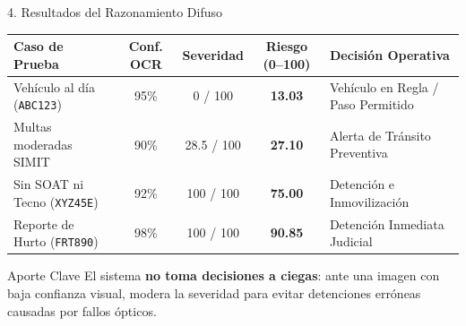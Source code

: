 \documentclass[aspectratio=169, 10pt]{beamer}
\begin{document}
\begin{frame}{4. Resultados del Razonamiento Difuso}
    \begin{table}[h]
        \centering
        \small
        \begin{tabularx}{\textwidth}{@{}l c c c X@{}}
            \toprule
            \textbf{Caso de Prueba} & \textbf{Conf. OCR} & \textbf{Severidad} & \textbf{Riesgo (0--100)} & \textbf{Decisión Operativa} \\
            \midrule
            Vehículo al día (\texttt{ABC123}) & 95\% & 0 / 100 & \textbf{13.03} & \textcolor{accentGreen}{Vehículo en Regla / Paso Permitido} \\
            Multas moderadas SIMIT & 90\% & 28.5 / 100 & \textbf{27.10} & \textcolor{accentOrange}{Alerta de Tránsito Preventiva} \\
            Sin SOAT ni Tecno (\texttt{XYZ45E}) & 92\% & 100 / 100 & \textbf{75.00} & \textcolor{accentRed}{Detención e Inmovilización} \\
            Reporte de Hurto (\texttt{FRT890}) & 98\% & 100 / 100 & \textbf{90.85} & \textcolor{accentRed}{Detención Inmediata Judicial} \\
            \bottomrule
        \end{tabularx}
    \end{table}

    \begin{block}{Aporte Clave}
        El sistema \textbf{no toma decisiones a ciegas}: ante una imagen con baja confianza visual, modera la severidad para evitar detenciones erróneas causadas por fallos ópticos.
    \end{block}
\end{frame}
\end{document}
